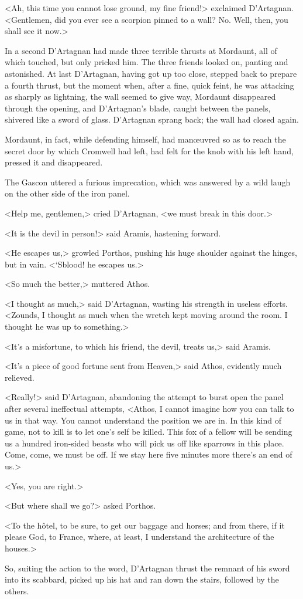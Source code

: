 <Ah, this time you cannot lose ground, my fine friend!> exclaimed D'Artagnan. <Gentlemen, did you ever see a scorpion pinned to a wall? No. Well, then, you shall see it now.>

In a second D'Artagnan had made three terrible thrusts at Mordaunt, all of which touched, but only pricked him. The three friends looked on, panting and astonished. At last D'Artagnan, having got up too close, stepped back to prepare a fourth thrust, but the moment when, after a fine, quick feint, he was attacking as sharply as lightning, the wall seemed to give way, Mordaunt disappeared through the opening, and D'Artagnan's blade, caught between the panels, shivered like a sword of glass. D'Artagnan sprang back; the wall had closed again.

Mordaunt, in fact, while defending himself, had manœuvred so as to reach the secret door by which Cromwell had left, had felt for the knob with his left hand, pressed it and disappeared.

The Gascon uttered a furious imprecation, which was answered by a wild laugh on the other side of the iron panel.

<Help me, gentlemen,> cried D'Artagnan, <we must break in this door.>

<It is the devil in person!> said Aramis, hastening forward.

<He escapes us,> growled Porthos, pushing his huge shoulder against the hinges, but in vain. <‘Sblood! he escapes us.>

<So much the better,> muttered Athos.

<I thought as much,> said D'Artagnan, wasting his strength in useless efforts. <Zounds, I thought as much when the wretch kept moving around the room. I thought he was up to something.>

<It's a misfortune, to which his friend, the devil, treats us,> said Aramis.

<It's a piece of good fortune sent from Heaven,> said Athos, evidently much relieved.

<Really!> said D'Artagnan, abandoning the attempt to burst open the panel after several ineffectual attempts, <Athos, I cannot imagine how you can talk to us in that way. You cannot understand the position we are in. In this kind of game, not to kill is to let one's self be killed. This fox of a fellow will be sending us a hundred iron-sided beasts who will pick us off like sparrows in this place. Come, come, we must be off. If we stay here five minutes more there's an end of us.>

<Yes, you are right.>

<But where shall we go?> asked Porthos.

<To the hôtel, to be sure, to get our baggage and horses; and from there, if it please God, to France, where, at least, I understand the architecture of the houses.>

So, suiting the action to the word, D'Artagnan thrust the remnant of his sword into its scabbard, picked up his hat and ran down the stairs, followed by the others. 